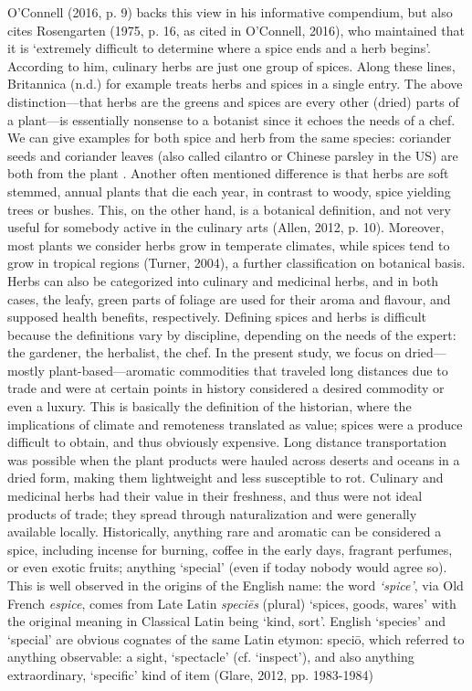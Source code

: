 O'Connell (2016, p. 9) backs this view in his informative compendium, but also cites Rosengarten (1975, p. 16, as cited in O'Connell, 2016), who maintained that it is `extremely difficult to determine where a spice ends and a herb begins'. According to him, culinary herbs are just one group of spices. Along these lines, Britannica (n.d.) for example treats herbs and spices in a single entry.
The above distinction---that herbs are the greens and spices are every other (dried) parts of a plant---is essentially nonsense to a botanist since it echoes the needs of a chef. We can give examples for both spice and herb from the same species: coriander seeds and coriander leaves (also called cilantro or Chinese parsley in the US) are both from the plant . Another often mentioned difference is that herbs are soft stemmed, annual plants that die each year, in contrast to woody, spice yielding trees or bushes. This, on the other hand, is a botanical definition, and not very useful for somebody active in the culinary arts (Allen, 2012, p. 10). Moreover, most plants we consider herbs grow in temperate climates, while spices tend to grow in tropical regions (Turner, 2004), a further classification on botanical basis. Herbs can also be categorized into culinary and medicinal herbs, and in both cases, the leafy, green parts of foliage are used for their aroma and flavour, and supposed health benefits, respectively.
Defining spices and herbs is difficult because the definitions vary by discipline, depending on the needs of the expert: the gardener, the herbalist, the chef. In the present study, we focus on dried---mostly plant-based---aromatic commodities that traveled long distances due to trade and were at certain points in history considered a desired commodity or even a luxury. This is basically the definition of the historian, where the implications of climate and remoteness translated as value; spices were a produce difficult to obtain, and thus obviously expensive. Long distance transportation was possible when the plant products were hauled across deserts and oceans in a dried form, making them lightweight and less susceptible to rot. Culinary and medicinal herbs had their value in their freshness, and thus were not ideal products of trade; they spread through naturalization and were generally available locally. Historically, anything rare and aromatic can be considered a spice, including incense for burning, coffee in the early days, fragrant perfumes, or even exotic fruits; anything `special' (even if today nobody would agree so). This is well observed in the origins of the English name: the word \textit{`spice'}, via Old French \textit{espice}, comes from Late Latin \textit{speciēs} (plural) `spices, goods, wares' with the original meaning in Classical Latin being `kind, sort'. English `species' and `special' are obvious cognates of the same Latin etymon: speciō, which referred to anything observable: a sight, `spectacle' (cf. `inspect'), and also anything extraordinary, `specific' kind of item (Glare, 2012, pp. 1983-1984)
